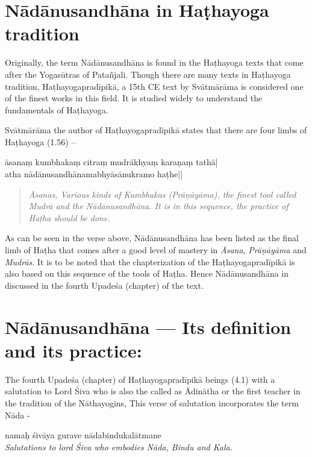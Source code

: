 \section*{Nādānusandhāna in Haṭhayoga tradition}

Originally, the term Nādānusandhāna is found in the Haṭhayoga texts that come after the Yogasūtras of Patañjali. Though there are many texts in Haṭhayoga tradition, Haṭhayogapradīpikā, a 15th CE text by Svātmārāma is considered one of the finest works in this field. It is studied widely to understand the fundamentals of Haṭhayoga.

Svātmārāma the author of Haṭhayogapradīpikā states that there are four limbs of Haṭhayoga (1.56) –

\begin{shloka}
āsanaṃ kumbhakaṃ citraṃ mudrākhyaṃ karaṇaṃ tathā|\\
atha nādānusandhānamabhyāsānukramo haṭhe||
\end{shloka}

\begin{quote}
\textit{Āsanas, Various kinds of Kumbhakas (Prāṇāyāma), the finest tool called Mudrā and the Nādānusandhāna. It is in this sequence, the practice of Haṭha should be done.}
\end{quote}

As can be seen in the verse above, Nādānusandhāna has been listed as the final limb of Haṭha that comes after a good level of mastery in \textit{Āsana}, \textit{Prāṇāyāma} and \textit{Mudrās}. It is to be noted that the chapterization of the Haṭhayogapradīpikā is also based on this sequence of the tools of Haṭha. Hence Nādānusandhāna in discussed in the fourth Upadeśa (chapter) of the text.   

\section*{Nādānusandhāna ---  Its definition and its practice:}

The fourth Upadeśa (chapter) of Haṭhayogapradīpikā beings (4.1) with a salutation to Lord Śiva who is also the called as Ādinātha or the first teacher in the tradition of the Nāthayogins, This verse of salutation incorporates the term Nāda - 

\begin{center}
namaḥ śivāya gurave nādabindukalātmane\\
\textit{Salutations to lord Śiva who embodies Nāda, Bindu and Kala.}
\end{center}

